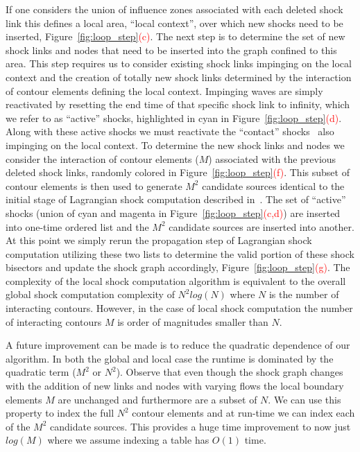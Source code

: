 \begin{appendices}
If one considers the union of influence zones associated with each deleted shock link this defines a local area, ``local context'', over which new shocks need to be inserted, Figure~\ref{fig:loop_step}\textcolor{red}{(c)}. The next step is to determine the set of new shock links and nodes that need to be inserted into the graph confined to this area. This step requires us to consider existing shock links impinging on the local context and the creation of totally new shock links determined by the interaction of contour elements defining the local context. Impinging waves are simply reactivated by resetting the end time of that specific shock link to infinity, which we refer to as “active” shocks, highlighted in cyan in Figure~\ref{fig:loop_step}\textcolor{red}{(d)}. Along with these active shocks we must reactivate the ``contact'' shocks~\cite{Tamrakar:Kimia:Shock} also impinging on the local context. To determine the new shock links and nodes we consider the interaction of contour elements ($M$) associated with the previous deleted shock links, randomly colored in Figure~\ref{fig:loop_step}\textcolor{red}{(f)}. This subset of contour elements is then used to generate $M^2$ candidate sources identical to the initial stage of Lagrangian shock computation described in~\cite{Tamrakar:Kimia:Shock}. The set of “active” shocks (union of cyan and magenta in Figure~\ref{fig:loop_step}\textcolor{red}{(c,d)}) are inserted into one-time ordered list and the $M^2$ candidate sources are inserted into another. At this point we simply rerun the propagation step of Lagrangian shock computation utilizing these two lists to determine the valid portion of these shock bisectors and update the shock graph accordingly, Figure~\ref{fig:loop_step}\textcolor{red}{(g)}. The complexity of the local shock computation algorithm is equivalent to the overall global shock computation complexity of $N^2log(N)$ where $N$ is the number of interacting contours. However, in the case of local shock computation the number of interacting contours $M$ is order of magnitudes smaller than $N$.
 
A future improvement can be made is to reduce the quadratic dependence of our algorithm. In both the global and local case the runtime is dominated by the quadratic term ($M^2$ or $N^2$). Observe that even though the shock graph changes with the addition of new links and nodes with varying flows the local boundary elements $M$ are unchanged and furthermore are a subset of $N$. We can use this property to index the full $N^2$ contour elements and at run-time we can index each of the $M^2$ candidate sources. This provides a huge time improvement to now just $log(M)$ where we assume indexing a table has $O(1)$ time. 
	

\end{appendices}
